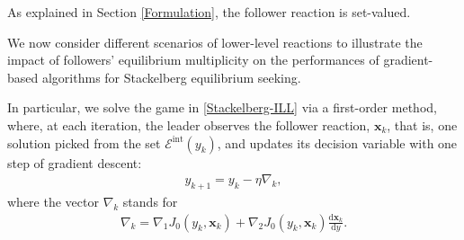 \documentclass[letterpaper, 10 pt, conference]{ieeeconf}
\newcommand\xbf{\mathbf{x}}
\begin{document}
As explained in Section \ref{Formulation}, the follower reaction is set-valued. 

We now consider different scenarios of lower-level reactions to illustrate the impact of followers' equilibrium multiplicity on the performances of gradient-based algorithms for Stackelberg equilibrium seeking. 

In particular, we solve the game in \eqref{Stackelberg-ILL} via a first-order method, where, at each iteration, the leader observes the follower reaction, $\xbf_k$, that is, one solution picked from the set $\mathcal{E}^\mathrm{int}(y_k)$, and updates its decision variable with one step of gradient descent: 
\begin{align}\label{update}
    y_{k+1}=y_k-\eta \nabla_k,
\end{align}
where the vector $\nabla_k$ stands for
\begin{align}\label{ChainRule}
\nabla_k=\nabla_1 J_0(y_k, \xbf_k)+\nabla_2 J_0(y_k, \xbf_k) \frac{\mathrm{d} \xbf_k}{\text{d}y}.
\end{align}
\end{document}
